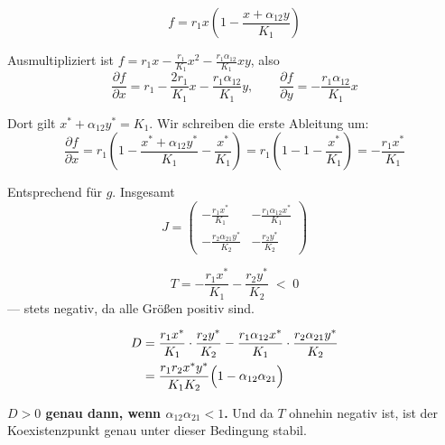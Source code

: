 \begin{merksatz}
\[ f = r_1x\left(1 - \frac{x+\alpha_{12}y}{K_1}\right) \]

Ausmultipliziert ist $f = r_1x - \frac{r_1}{K_1}x^2 - \frac{r_1\alpha_{12}}{K_1}xy$, also
\[ \frac{\partial f}{\partial x} = r_1 - \frac{2r_1}{K_1}x - \frac{r_1\alpha_{12}}{K_1}y, \qquad \frac{\partial f}{\partial y} = -\frac{r_1\alpha_{12}}{K_1}x \]

Dort gilt $x^{*}+\alpha_{12}y^{*} = K_1$. Wir schreiben die erste Ableitung um:
\[ \frac{\partial f}{\partial x} = r_1\left(1 - \frac{x^{*}+\alpha_{12}y^{*}}{K_1} - \frac{x^{*}}{K_1}\right) = r_1\left(1 - 1 - \frac{x^{*}}{K_1}\right) = -\frac{r_1x^{*}}{K_1} \]

Entsprechend für $g$. Insgesamt
\[ J = \begin{pmatrix}
-\frac{r_1x^{*}}{K_1} & -\frac{r_1\alpha_{12}x^{*}}{K_1}\\[6pt]
-\frac{r_2\alpha_{21}y^{*}}{K_2} & -\frac{r_2y^{*}}{K_2}
\end{pmatrix} \]

\[ T = -\frac{r_1x^{*}}{K_1} - \frac{r_2y^{*}}{K_2} \;<\; 0 \]
--- stets negativ, da alle Größen positiv sind.

\begin{align*}
D &= \frac{r_1x^{*}}{K_1}\cdot\frac{r_2y^{*}}{K_2} - \frac{r_1\alpha_{12}x^{*}}{K_1}\cdot\frac{r_2\alpha_{21}y^{*}}{K_2}\\
&= \frac{r_1r_2x^{*}y^{*}}{K_1K_2}\Bigl(1 - \alpha_{12}\alpha_{21}\Bigr)
\end{align*}

\begin{center}
\begin{minipage}{0.9\textwidth}
\textbf{$D > 0$ genau dann, wenn $\alpha_{12}\alpha_{21} < 1$.} Und da $T$ ohnehin negativ ist, ist der Koexistenzpunkt genau unter dieser Bedingung stabil.
\end{minipage}
\end{center}

\begin{center}
\begin{minipage}{0.88\textwidth}
\end{minipage}
\end{center}
\end{merksatz}

